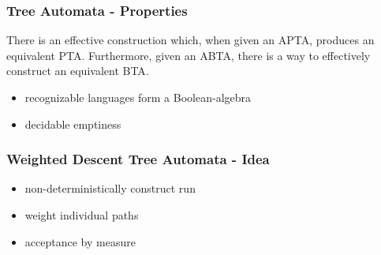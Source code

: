 \documentclass{beamer}
\begin{document}
  \begin{frame}
    \frametitle{Tree Automata - Properties}
    \begin{theorem}
      There is an effective construction which, when given an \ac{APTA},
      produces an equivalent \ac{PTA}. Furthermore, given an \ac{ABTA}, there
      is a way to effectively construct an equivalent \ac{BTA}.
    \end{theorem}
    \begin{itemize}
      \item recognizable languages form a Boolean-algebra
      \item decidable emptiness
    \end{itemize}
  \end{frame}

  \begin{frame}
    \frametitle{Weighted Descent Tree Automata - Idea}
    \begin{itemize}
      \item non-deterministically construct run
      \item<2-> weight individual paths
      \item<3-> acceptance by measure
    \end{itemize}
    \begin{overlayarea}{\textwidth}{0.6\textheight}
      \begin{center}
      \end{center}
    \end{overlayarea}
  \end{frame}
\end{document}
